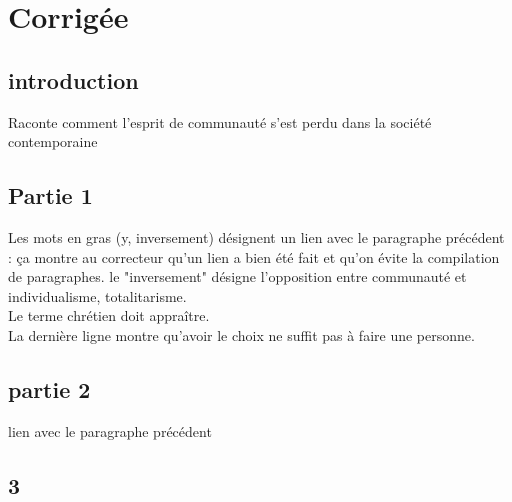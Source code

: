\section{Corrigée}

\subsection{introduction}
Raconte comment l'esprit de communauté s'est perdu dans la société contemporaine

\subsection{Partie 1}
Les mots en gras (y, inversement) désignent un lien avec le paragraphe précédent : ça montre au correcteur qu'un lien a bien été fait et qu'on évite la compilation de paragraphes. le "inversement" désigne l'opposition entre communauté et individualisme, totalitarisme.\\
Le terme chrétien doit appraître.\\
La dernière ligne montre qu'avoir le choix ne suffit pas à faire une personne.

\subsection{partie 2}
lien avec le paragraphe précédent

\subsection{3}


